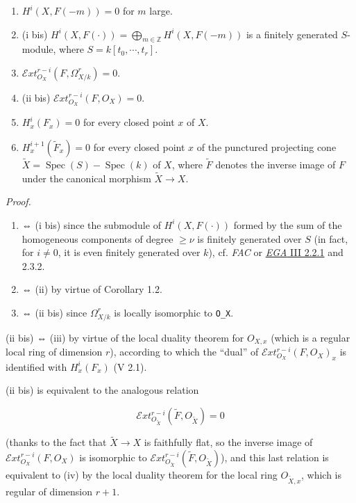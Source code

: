 \documentclass[
  11pt,
  a4paper,
]{book}
\providecommand{\tightlist}{%
  \setlength{\itemsep}{0pt}\setlength{\parskip}{0pt}}
\begin{document}
\begin{enumerate}
\def\labelenumi{\arabic{enumi}.}
\tightlist
\item
  \(H^{i}(X, F(-m)) = 0\) for \(m\) large.
\item
  (i bis)
  \(H^{i}(X, F(\cdot)) = \bigoplus_{m \in \mathbb{Z}} H^{i}(X, F(-m))\)
  is a finitely generated \(S\)-module, where
  \(S = k[t_{0}, \cdots, t_{r}]\).
\item
  \(\mathcal{E}xt^{r-i}_{O_{X}}(F, \Omega^{r}_{X/k}) = 0\).
\item
  (ii bis) \(\mathcal{E}xt^{r-i}_{O_{X}}(F, O_{X}) = 0\).
\item
  \(H^{i}_{x}(F_{x}) = 0\) for every closed point \(x\) of \(X\).
\item
  \(H^{i+1}_{x}(\tilde{F}_{x}) = 0\) for every closed point \(x\) of the
  punctured projecting cone \(\tilde{X} =
  \operatorname{Spec}(S) - \operatorname{Spec}(k)\) of \(X\), where
  \(\tilde{F}\) denotes the inverse image of \(F\) under the canonical
  morphism \(\tilde{X} \to X\).
\end{enumerate}

\emph{Proof.}

\begin{enumerate}
\def\labelenumi{(\roman{enumi})}
\item
  ⇔ (i bis) since the submodule of \(H^{i}(X, F(\cdot))\) formed by the
  sum of the homogeneous components of degree \(\geqslant \nu\) is
  finitely generated over \(S\) (in fact, for \(i \neq 0\), it is even
  finitely generated over \(k\)), cf. \emph{FAC} or
  \href{https://jcreinhold.github.io/ega/iii/09-ch3-02-cohomology-projective-morphisms.html\#22-the-fundamental-theorem-of-projective-morphisms}{\emph{EGA}
  III 2.2.1} and 2.3.2.
\item
  ⇔ (ii) by virtue of Corollary 1.2.
\item
  ⇔ (ii bis) since \(\Omega^{r}_{X/k}\) is locally isomorphic to
  \texttt{O\_X}.
\end{enumerate}

(ii bis) ⇔ (iii) by virtue of the local duality theorem for \(O_{X,x}\)
(which is a regular local ring of dimension \(r\)), according to which
the ``dual'' of \(\mathcal{E}xt^{r-i}_{O_{X}}(F, O_{X})_{x}\) is
identified with \(H^{i}_{x}(F_{x})\) (V 2.1).

(ii bis) is equivalent to the analogous relation

\[ \mathcal{E}xt^{r-i}_{O_{\tilde{X}}}(\tilde{F}, O_{\tilde{X}}) = 0 \]

(thanks to the fact that \(\tilde{X} \to X\) is faithfully flat, so the
inverse image of \(\mathcal{E}xt^{r-i}_{O_{X}}(F,
O_{X})\) is isomorphic to
\(\mathcal{E}xt^{r-i}_{O_{\tilde{X}}}(\tilde{F}, O_{\tilde{X}})\)), and
this last relation is equivalent to (iv) by the local duality theorem
for the local ring \(O_{\tilde{X},x}\), which is regular of dimension
\(r +
1\).
\end{document}
